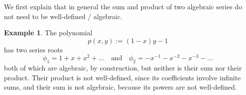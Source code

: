 \documentclass[a4paper,draft]{amsart}
\theoremstyle{definition}
\newtheorem{Example}{Example}
\begin{document}


We first explain that in general the sum and product of two algebraic series do not need to be well-defined / algebraic. 

\begin{Example}
The polynomial 
\begin{equation*}
p(x,y) := (1-x) y -1 
\end{equation*}
has two series roots
\begin{equation*}
\phi_1 = 1 + x + x ^2 + \dots \quad \text{and} \quad \phi_2 = - x^{-1} - x^{-2} - x^{-3} - \dots
\end{equation*}
both of which are algebraic, by construction, but neither is their sum nor their product. Their product is not well-defined, since its coefficients involve infinite sums, and their sum is not algebraic, because its powers are not well-defined.
\end{Example}
\end{document}

